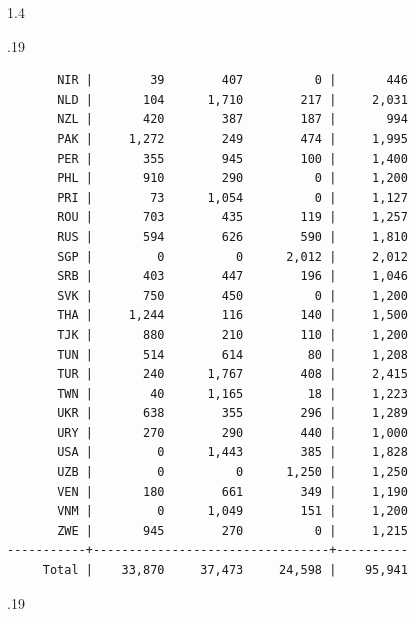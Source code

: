 \documentclass[10pt, letterpaper]{article}
\begin{document}
\begin{spacing}{1.4}
\begin{scriptsize}
\begin{spacing}{.19}
\begin{verbatim}
       NIR |        39        407          0 |       446 
       NLD |       104      1,710        217 |     2,031 
       NZL |       420        387        187 |       994 
       PAK |     1,272        249        474 |     1,995 
       PER |       355        945        100 |     1,400 
       PHL |       910        290          0 |     1,200 
       PRI |        73      1,054          0 |     1,127 
       ROU |       703        435        119 |     1,257 
       RUS |       594        626        590 |     1,810 
       SGP |         0          0      2,012 |     2,012 
       SRB |       403        447        196 |     1,046 
       SVK |       750        450          0 |     1,200 
       THA |     1,244        116        140 |     1,500 
       TJK |       880        210        110 |     1,200 
       TUN |       514        614         80 |     1,208 
       TUR |       240      1,767        408 |     2,415 
       TWN |        40      1,165         18 |     1,223 
       UKR |       638        355        296 |     1,289 
       URY |       270        290        440 |     1,000 
       USA |         0      1,443        385 |     1,828 
       UZB |         0          0      1,250 |     1,250 
       VEN |       180        661        349 |     1,190 
       VNM |         0      1,049        151 |     1,200 
       ZWE |       945        270          0 |     1,215 
-----------+---------------------------------+----------
     Total |    33,870     37,473     24,598 |    95,941 
\end{verbatim}
\end{spacing}{.19}
\end{scriptsize}






\end{spacing}
\end{document}
